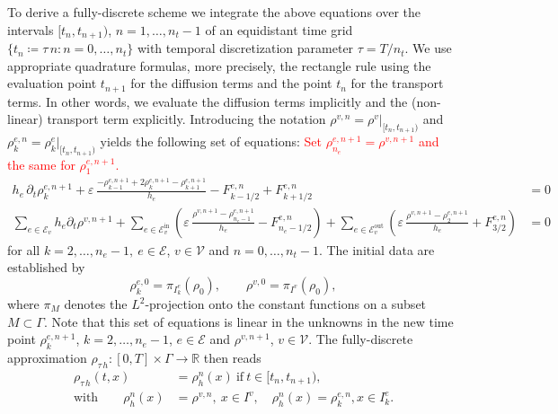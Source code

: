 To derive a fully-discrete scheme we integrate the above equations over the intervals $[t_n,t_{n+1})$, $n=1,\ldots,n_t-1$ of an equidistant time grid $\{t_n\coloneqq \tau\,n\colon n=0,\ldots,n_t\}$ with temporal discretization parameter $\tau = T/n_t$. We use appropriate quadrature formulas, more precisely, the rectangle rule using the evaluation point $t_{n+1}$ for the diffusion terms and the point $t_n$ for the transport terms. In other words, we evaluate the diffusion terms implicitly and the (non-linear) transport term explicitly. Introducing the notation $\rho^{v,n} = \rho^v|_{[t_n,t_{n+1})}$ and $\rho_k^{e,n} = \rho_k^e|_{[t_n,t_{n+1})}$ yields the following set of equations: \textcolor{red}{Set $\rho^{e,n+1}_{n_e} = \rho^{v,n+1}$ and the same for $\rho^{e,n+1}_1$.}
\begin{subequations}
    \label{eq:fully_discrete_fvm}
    \begin{align}
        h_e\,\partial_t \rho_k^{e,n+1} + \varepsilon\,\frac{-\rho_{k-1}^{e,n+1} +
        2\rho_k^{e,n+1} - \rho_{k+1}^{e,n+1}}{h_e} - F_{k-1/2}^{e,n} +
        F_{k+1/2}^{e,n} &= 0 \\	
        \sum_{e\in \mathcal{E}_v} h_e\partial_t\rho^{v,n+1}
        + \sum_{e\in \mathcal{E}_v^{\text{in}}}
        \left(\varepsilon\,\frac{\rho^{v,n+1}-\rho_{n_e-1}^{e,n+1}}{h_e} -
        F^{e,n}_{n_e-1/2}\right)
        + \sum_{e\in \mathcal{E}_v^{\text{out}}}
        \left(\varepsilon\,\frac{\rho^{v,n+1}-\rho_2^{e,n+1}}{h_e} + F^{e,n}_{3/2}\right)
        &= 0
    \end{align}
\end{subequations}
for all $k=2,\ldots,n_e-1,\ e\in \mathcal{E}$, $v\in \mathcal{V}$ and $n=0,\ldots,n_t-1$. The initial data are established by
\begin{equation*}
	\rho_k^{e,0}=\pi_{I_k^e}(\rho_0),\qquad \rho^{v,0} = \pi_{I^v}(\rho_0),
\end{equation*}
where $\pi_M$ denotes the $L^2$-projection onto the constant functions on a subset $M \subset \Gamma$. Note that this set of equations is linear in the unknowns in the new time point $\rho_k^{e,n+1}$, $k=2,\ldots,n_e-1$, $e\in \mathcal{E}$ and $\rho^{v,n+1}$, $v\in \mathcal{V}$. The fully-discrete approximation $\rho_{\tau\,h}\colon [0,T]\times \Gamma\to \mathbb{R}$ then reads
\begin{align*}
	\rho_{\tau\,h}(t,x) &= \rho_h^n(x)\ \text{if}\ t\in [t_n,t_{n+1}),\\
	\text{with}\qquad \rho_h^n(x) &= \rho^{v,n},\ x\in I^v,\quad \rho_h^n(x)
	= \rho_k^{e,n}, x\in I_k^e.
\end{align*}

